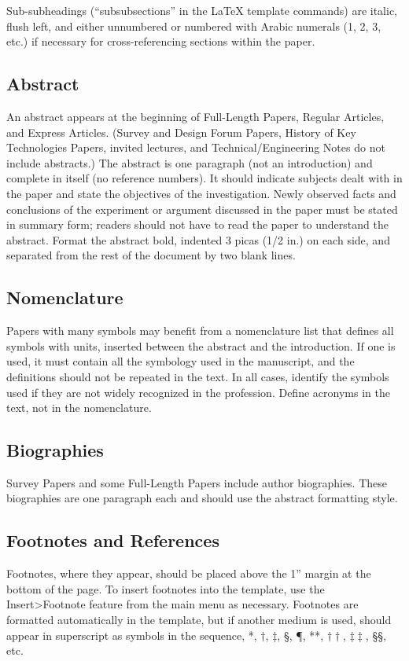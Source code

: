 \documentclass[journal]{new-aiaa}
\begin{document}
Sub-subheadings (``subsubsections'' in the \LaTeX{} template commands) are italic, flush left, and either unnumbered or numbered with Arabic numerals (1, 2, 3, etc.) if necessary for cross-referencing sections within the paper.


\subsection{Abstract}
An abstract appears at the beginning of Full-Length Papers, Regular Articles, and Express Articles. (Survey and Design Forum Papers, History of Key Technologies Papers, invited lectures, and Technical/Engineering Notes do not include abstracts.) The abstract is one paragraph (not an introduction) and complete in itself (no reference numbers). It should indicate subjects dealt with in the paper and state the objectives of the investigation. Newly observed facts and conclusions of the experiment or argument discussed in the paper must be stated in summary form; readers should not have to read the paper to understand the abstract. Format the abstract bold, indented 3 picas (1/2 in.) on each side, and separated from the rest of the document by two blank lines.


\subsection{Nomenclature}
Papers with many symbols may benefit from a nomenclature list that defines all symbols with units, inserted between the abstract and the introduction. If one is used, it must contain all the symbology used in the manuscript, and the definitions should not be repeated in the text. In all cases, identify the symbols used if they are not widely recognized in the profession. Define acronyms in the text, not in the nomenclature. 

\subsection{Biographies}
Survey Papers and some Full-Length Papers include author biographies. These biographies are one paragraph each and should use the abstract formatting style.

\subsection{Footnotes and References}
Footnotes, where they appear, should be placed above the 1'' margin at the bottom of the page. To insert footnotes into the template, use the Insert>Footnote feature from the main menu as necessary. Footnotes are formatted automatically in the template, but if another medium is used, should appear in superscript as symbols in the sequence, *, $\dag$, $\ddag$, \S, \P, **, $\dag\dag$, $\ddag\ddag$, \S\S, etc.
\end{document}
